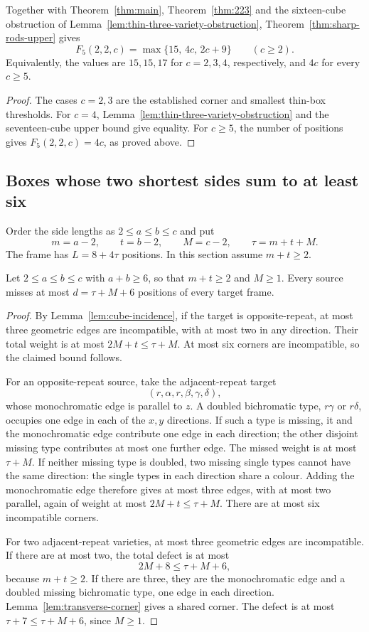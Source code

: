 \begin{proposition}\label{cor:sharp-rods}
Together with Theorem~\ref{thm:main}, Theorem~\ref{thm:223} and
the sixteen-cube obstruction of Lemma~\ref{lem:thin-three-variety-obstruction},
Theorem~\ref{thm:sharp-rods-upper} gives
\[
 F_5(2,2,c)=\max\{15,\,4c,\,2c+9\}\qquad(c\ge2).
\]
Equivalently, the values are $15,15,17$ for $c=2,3,4$, respectively,
and $4c$ for every $c\ge5$.
\end{proposition}
\begin{proof}
The cases $c=2,3$ are the established corner and smallest thin-box
thresholds. For $c=4$, Lemma~\ref{lem:thin-three-variety-obstruction} and the seventeen-cube
upper bound give equality. For $c\ge5$, the number of positions gives
$F_5(2,2,c)=4c$, as proved above.
\end{proof}
\subsection{Boxes whose two shortest sides sum to at least six}

Order the side lengths as $2\le a\le b\le c$ and put
\[
 m=a-2,\qquad t=b-2,\qquad M=c-2,\qquad \tau=m+t+M.
\]
The frame has $L=8+4\tau$ positions. In this section assume $m+t\ge2$.

\begin{lemma}\label{lem:box-weighted}
Let $2\le a\le b\le c$ with $a+b\ge6$, so that $m+t\ge2$ and $M\ge1$.
Every source misses at most $d=\tau+M+6$ positions of every target frame.
\end{lemma}
\begin{proof}
By Lemma~\ref{lem:cube-incidence}, if the target is opposite-repeat,
at most three geometric edges are
incompatible, with at most two in any direction. Their total weight is
at most $2M+t\le \tau+M$. At most six corners are incompatible, so the
claimed bound follows.

For an opposite-repeat source, take the adjacent-repeat target
\[
 (r,\alpha,r,\beta,\gamma,\delta),
\]
whose monochromatic edge is parallel to $z$.
A doubled bichromatic type, $r\gamma$ or $r\delta$, occupies one edge in each of
the $x,y$ directions. If such a type is missing, it and the monochromatic
edge contribute one edge in each direction; the other disjoint missing
type contributes at most one further edge. The missed weight is at most
$\tau+M$. If neither missing type is doubled, two missing single types
cannot have the same direction: the single types in each direction
share a colour. Adding the monochromatic edge therefore gives at most
three edges, with at most two parallel, again of weight at most
$2M+t\le \tau+M$. There are at most six incompatible corners.

For two adjacent-repeat varieties, at most three geometric edges are
incompatible. If there are at most two, the total defect is at most
\[
 2M+8\le \tau+M+6,
\]
because $m+t\ge2$. If there are three, they are the monochromatic edge
and a doubled missing bichromatic type, one edge in each direction.
Lemma~\ref{lem:transverse-corner}
gives a shared corner. The defect is at most
$\tau+7\le \tau+M+6$, since $M\ge1$.
\end{proof}

